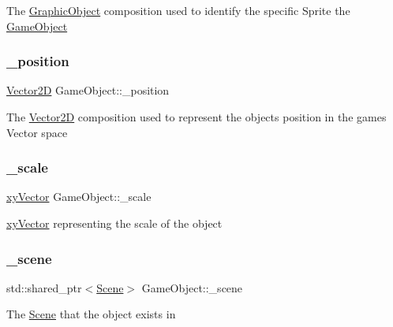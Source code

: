 The \hyperlink{class_graphic_object}{Graphic\+Object} composition used to identify the specific Sprite the \hyperlink{class_game_object}{Game\+Object} \mbox{\label{class_game_object_af86156ef21da475d68de98761cf75512}} 
\subsubsection{\texorpdfstring{\+\_\+position}{\_position}}
{\footnotesize\ttfamily \hyperlink{class_vector2_d}{Vector2D} Game\+Object\+::\+\_\+position\hspace{0.3cm}{\ttfamily [protected]}}

The \hyperlink{class_vector2_d}{Vector2D} composition used to represent the objects position in the game\textquotesingle{}s Vector space \mbox{\label{class_game_object_a9b76f90eef67b329538d15b4eeed67a1}} 
\subsubsection{\texorpdfstring{\+\_\+scale}{\_scale}}
{\footnotesize\ttfamily \hyperlink{structxy_vector}{xy\+Vector} Game\+Object\+::\+\_\+scale\hspace{0.3cm}{\ttfamily [protected]}}

\hyperlink{structxy_vector}{xy\+Vector} representing the scale of the object \mbox{\label{class_game_object_ab8cae1a41ad1443d085c397b5e6d5609}} 
\subsubsection{\texorpdfstring{\+\_\+scene}{\_scene}}
{\footnotesize\ttfamily std\+::shared\+\_\+ptr$<$\hyperlink{class_scene}{Scene}$>$ Game\+Object\+::\+\_\+scene\hspace{0.3cm}{\ttfamily [protected]}}

The \hyperlink{class_scene}{Scene} that the object exists in \mbox{\label{class_game_object_aebfec45400aff20c8eab3fbf00be0aea}} 
